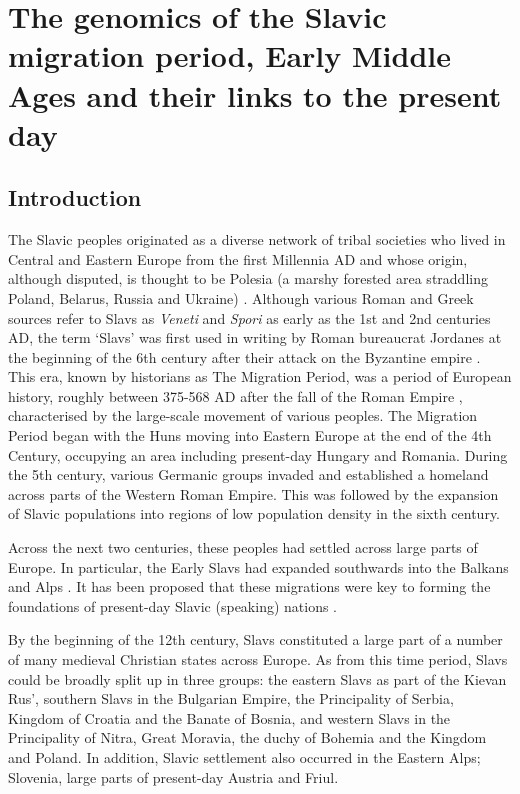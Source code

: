 \chapter{The genomics of the Slavic migration period, Early Middle Ages and their links to the present day}
\label{chapterlabel5}

\section{Introduction}

The Slavic peoples originated as a diverse network of tribal societies who lived in Central and Eastern Europe from the first Millennia AD \cite{barford2001early} and whose origin, although disputed, is thought to be Polesia (a marshy forested area straddling Poland, Belarus, Russia and Ukraine) \cite{fouracre1995new}. Although various Roman and Greek sources refer to Slavs as \textit{Veneti} and \textit{Spori} as early as the 1st and 2nd centuries AD, the term `Slavs' was first used in writing by Roman bureaucrat Jordanes at the beginning of the 6th century after their attack on the Byzantine empire \cite{curta2006southeastern}. This era, known by historians as The Migration Period, was a period of European history, roughly between 375-568 AD after the fall of the Roman Empire \cite{halsall2007barbarian}, characterised by the large-scale movement of various peoples. The Migration Period began with the Huns moving into Eastern Europe at the end of the 4th Century, occupying an area including present-day Hungary and Romania. During the 5th century, various Germanic groups invaded and established a homeland across parts of the Western Roman Empire. This was followed by the expansion of Slavic populations into regions of low population density in the sixth century.

Across the next two centuries, these peoples had settled across large parts of Europe. In particular, the Early Slavs had expanded southwards into the Balkans and Alps \cite{barford2001early, brather2008archaologie, geary2003myth,gojda1991ancient}. It has been proposed that these migrations were key to forming the foundations of present-day Slavic (speaking) nations \cite{barford2001early}.  

By the beginning of the 12th century, Slavs constituted a large part of a number of many medieval Christian states across Europe. As from this time period, Slavs could be broadly split up in three groups: the eastern Slavs as part of the Kievan Rus', southern Slavs in the Bulgarian Empire, the Principality of Serbia, Kingdom of Croatia and the Banate of Bosnia, and western Slavs in the Principality of Nitra, Great Moravia, the duchy of Bohemia and the Kingdom and Poland. In addition, Slavic settlement also occurred in the Eastern Alps; Slovenia, large parts of present-day Austria and Friul. 

